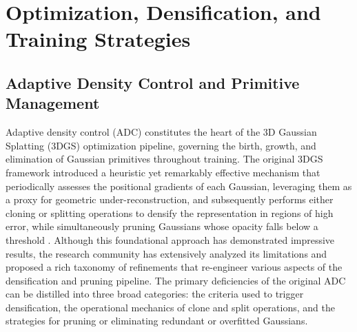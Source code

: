 \documentclass[11pt]{article}
\begin{document}
\section{Optimization, Densification, and Training Strategies}

\subsection{Adaptive Density Control and Primitive Management}

Adaptive density control (ADC) constitutes the heart of the 3D Gaussian Splatting (3DGS) optimization pipeline, governing the birth, growth, and elimination of Gaussian primitives throughout training. The original 3DGS framework introduced a heuristic yet remarkably effective mechanism that periodically assesses the positional gradients of each Gaussian, leveraging them as a proxy for geometric under-reconstruction, and subsequently performs either cloning or splitting operations to densify the representation in regions of high error, while simultaneously pruning Gaussians whose opacity falls below a threshold \cite{ref117}. Although this foundational approach has demonstrated impressive results, the research community has extensively analyzed its limitations and proposed a rich taxonomy of refinements that re-engineer various aspects of the densification and pruning pipeline. The primary deficiencies of the original ADC can be distilled into three broad categories: the criteria used to trigger densification, the operational mechanics of clone and split operations, and the strategies for pruning or eliminating redundant or overfitted Gaussians.
\end{document}
